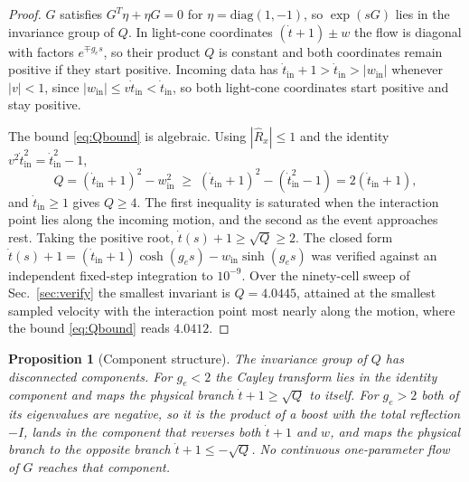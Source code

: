 \documentclass[aps,prd,reprint,nofootinbib]{revtex4-2}
\newtheorem{proposition}{Proposition}
\begin{document}
\begin{proof}
$G$ satisfies $G^{T} \eta + \eta G = 0$ for
$\eta = \mathrm{diag}(1, -1)$, so $\exp(sG)$ lies in the invariance
group of $Q$.  In light-cone coordinates $(\dot t + 1) \pm w$ the flow
is diagonal with factors $e^{\mp g_{e} s}$, so their product $Q$ is
constant and both coordinates remain positive if they start positive.
Incoming data has
$\dot t_{\mathrm{in}} + 1 > \dot t_{\mathrm{in}} > |w_{\mathrm{in}}|$
whenever $|v| < 1$, since
$|w_{\mathrm{in}}| \le v \dot t_{\mathrm{in}} < \dot t_{\mathrm{in}}$,
so both light-cone coordinates start positive and stay positive.

The bound \eqref{eq:Qbound} is algebraic.  Using
$|\hat R_{x}| \leq 1$ and the identity
$v^{2} \dot t_{\mathrm{in}}^{2} = \dot t_{\mathrm{in}}^{2} - 1$,
\begin{equation*}
Q = (\dot t_{\mathrm{in}} + 1)^{2} - w_{\mathrm{in}}^{2}
\;\geq\; (\dot t_{\mathrm{in}} + 1)^{2}
- \left(\dot t_{\mathrm{in}}^{2} - 1\right)
= 2\left(\dot t_{\mathrm{in}} + 1\right),
\end{equation*}
and $\dot t_{\mathrm{in}} \geq 1$ gives $Q \geq 4$.  The first
inequality is saturated when the interaction point lies along the
incoming motion, and the second as the event approaches rest.  Taking
the positive root, $\dot t(s) + 1 \geq \sqrt{Q} \geq 2$.  The closed
form
$\dot t(s) + 1 = (\dot t_{\mathrm{in}} + 1)\cosh(g_{e} s) -
w_{\mathrm{in}} \sinh(g_{e} s)$ was verified against an independent
fixed-step integration to $10^{-9}$.  Over the ninety-cell sweep of
Sec.~\ref{sec:verify} the smallest invariant is $Q = 4.0445$, attained
at the smallest sampled velocity with the interaction point most nearly
along the motion, where the bound \eqref{eq:Qbound} reads $4.0412$.
\end{proof}

\begin{proposition}[Component structure]
\label{prop:component}
The invariance group of $Q$ has disconnected components.  For
$g_{e} < 2$ the Cayley transform lies in the identity component and maps
the physical branch $\dot t + 1 \geq \sqrt{Q}$ to itself.  For
$g_{e} > 2$ both of its eigenvalues are negative, so it is the product
of a boost with the total reflection $-I$, lands in the component that
reverses both $\dot t + 1$ and $w$, and maps the physical branch to the
opposite branch $\dot t + 1 \leq -\sqrt{Q}$.  No continuous
one-parameter flow of $G$ reaches that component.
\end{proposition}
\end{document}
